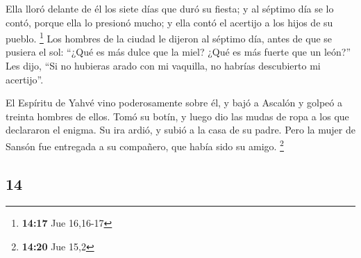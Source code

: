 \begin{paracol}{2}
 Ella lloró delante de él los siete días que duró su
fiesta; y al séptimo día se lo contó, porque ella lo presionó mucho; y
ella contó el acertijo a los hijos de su pueblo. \footnote{\textbf{14:17}
  Jue 16,16-17}  Los hombres de la ciudad le dijeron al
séptimo día, antes de que se pusiera el sol: ``¿Qué es más dulce que la
miel? ¿Qué es más fuerte que un león?'' Les dijo, ``Si no hubieras arado
con mi vaquilla, no habrías descubierto mi acertijo''.

 El Espíritu de Yahvé vino poderosamente sobre él, y bajó
a Ascalón y golpeó a treinta hombres de ellos. Tomó su botín, y luego
dio las mudas de ropa a los que declararon el enigma. Su ira ardió, y
subió a la casa de su padre.  Pero la mujer de Sansón fue
entregada a su compañero, que había sido su amigo. \footnote{\textbf{14:20}
  Jue 15,2}

\switchcolumn
\begin{otherlanguage}{english}

\hypertarget{section-27}{%
\section{14}\label{section-27}}


\end{otherlanguage}
\end{paracol}
